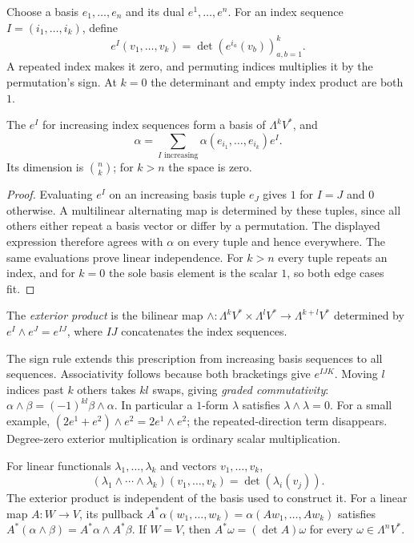 Choose a basis $e_1,\ldots,e_n$ and its dual $e^1,\ldots,e^n$. For an index sequence $I=(i_1,\ldots,i_k)$, define
\[
e^I(v_1,\ldots,v_k)=\det(e^{i_a}(v_b))_{a,b=1}^k.
\]
A repeated index makes it zero, and permuting indices multiplies it by the permutation's sign. At $k=0$ the determinant and empty index product are both $1$.

\begin{proposition}\label{prop:altbasis}
The $e^I$ for increasing index sequences form a basis of $\Lambda^kV^*$, and
\[
\alpha=\sum_{I\text{ increasing}}\alpha(e_{i_1},\ldots,e_{i_k})e^I.
\]
Its dimension is $\binom nk$; for $k>n$ the space is zero.
\end{proposition}

\begin{proof}
Evaluating $e^I$ on an increasing basis tuple $e_J$ gives $1$ for $I=J$ and $0$ otherwise. A multilinear alternating map is determined by these tuples, since all others either repeat a basis vector or differ by a permutation. The displayed expression therefore agrees with $\alpha$ on every tuple and hence everywhere. The same evaluations prove linear independence. For $k>n$ every tuple repeats an index, and for $k=0$ the sole basis element is the scalar $1$, so both edge cases fit.
\end{proof}

\begin{definition}
The \emph{exterior product} is the bilinear map $\wedge:\Lambda^kV^*\times\Lambda^lV^*\to\Lambda^{k+l}V^*$ determined by $e^I\wedge e^J=e^{IJ}$, where $IJ$ concatenates the index sequences.
\end{definition}

The sign rule extends this prescription from increasing basis sequences to all sequences. Associativity follows because both bracketings give $e^{IJK}$. Moving $l$ indices past $k$ others takes $kl$ swaps, giving \emph{graded commutativity}:
$\alpha\wedge\beta=(-1)^{kl}\beta\wedge\alpha$. In particular a $1$-form $\lambda$ satisfies $\lambda\wedge\lambda=0$. For a small example, $(2e^1+e^2)\wedge e^2=2e^1\wedge e^2$; the repeated-direction term disappears. Degree-zero exterior multiplication is ordinary scalar multiplication.

\begin{proposition}\label{prop:wedgedet}
For linear functionals $\lambda_1,\ldots,\lambda_k$ and vectors $v_1,\ldots,v_k$,
\[
(\lambda_1\wedge\cdots\wedge\lambda_k)(v_1,\ldots,v_k)
=\det(\lambda_i(v_j)).
\]
The exterior product is independent of the basis used to construct it. For a linear map $A:W\to V$, its pullback $A^*\alpha(w_1,\ldots,w_k)=\alpha(Aw_1,\ldots,Aw_k)$ satisfies
$A^*(\alpha\wedge\beta)=A^*\alpha\wedge A^*\beta$. If $W=V$, then $A^*\omega=(\det A)\omega$ for every $\omega\in\Lambda^nV^*$.
\end{proposition}

